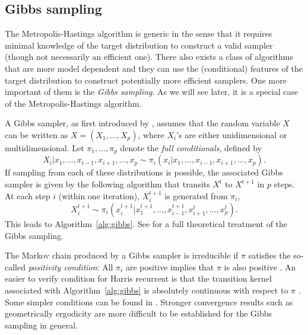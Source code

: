 \subsection{Gibbs sampling}
\label{sub:Gibbs sampling}

The Metropolis-Hastings algorithm is generic in the sense that it requires
minimal knowledge of the target distribution to construct a valid sampler
(though not necessarily an efficient one). There also exists a class of \mcmc
algorithms that are more model dependent and they can use the (conditional)
features of the target distribution to construct potentially more efficient
samplers. One more important of them is the \emph{Gibbs sampling}. As we will
see later, it is a special case of the Metropolis-Hastings algorithm.

A Gibbs sampler, as first introduced by \cite{Geman:1993bp}, assumes that the
random variable $X$ can be written as $X = (X_1,\dots,X_p)$, where $X_i$'s are
either unidimensional or multidimensional. Let $\pi_1,\dots,\pi_p$ denote the 
\emph{full conditionals}, defined by
\begin{equation}
  X_i|x_1,\dots,x_{i-1},x_{i+1},\dots,x_p
  \sim \pi_i(x_i|x_1,\dots,x_{i-1},x_{i+1},\dots,x_p).
\end{equation}
If sampling from each of these distributions is possible, the associated
Gibbs sampler is given by the following algorithm that transits $X^t$ to
$X^{t+1}$ in $p$ steps. At each step $i$ (within one iteration), $X_i^{t+1}$
is generated from $\pi_i$,
\begin{equation}
  X_i^{t+1} \sim
  \pi_i(x_i^{t+1}|x_1^{t+1},\dots,x_{i-1}^{t+1},x_{i+1}^t,\dots,x_p^t).
\end{equation}
This leads to Algorithm~\ref{alg:gibbs}. See \cite[][chap.~9
and~10]{Robert:2004tn} for a full theoretical treatment of the Gibbs sampling.



The Markov chain produced by a Gibbs sampler is irreducible if $\pi$
satisfies the so-called \emph{positivity condition}: All $\pi_i$ are positive
implies that $\pi$ is also positive \cite[][Theorem~10.8]{Robert:2004tn}. An
easier to verify condition for Harris recurrent is that the transition kernel
associated with Algorithm~\ref{alg:gibbs} is absolutely continuous with
respect to $\pi$ \cite{Tierney:1994uk}. Some simpler conditions can be found
in \cite{Hobert:1997vx}. Stronger convergence results such as geometrically
ergodicity are more difficult to be established for the Gibbs sampling in
general.

